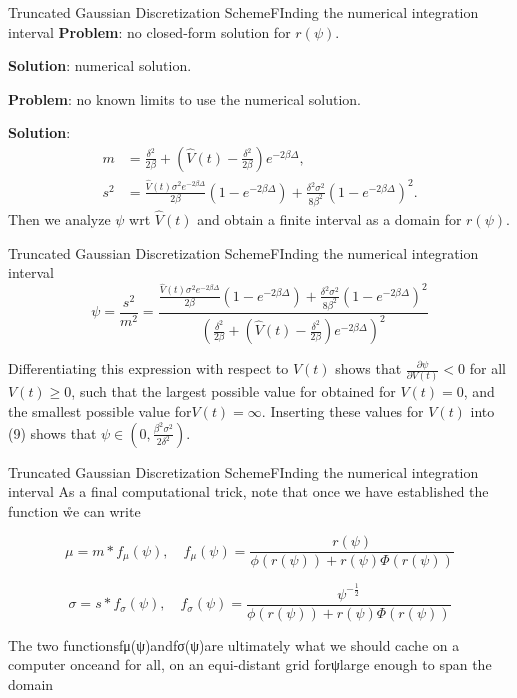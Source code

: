     \begin{frame}{Truncated Gaussian Discretization Scheme}{FInding the numerical integration interval}
        \textbf{Problem}: no closed-form solution for $r(\psi)$. 
        
        \textbf{Solution}: numerical solution.

        \textbf{Problem}: no known limits to use the numerical solution.

        \textbf{Solution}: 
        \begin{align}
            m   &= \frac{\delta^2}{2\beta} + \left(\hat{V}(t) - \frac{\delta^2}{2\beta}\right)e^{-2\beta \Delta},\\
            s^2 &= \frac{\hat{V}(t)\sigma^2e^{-2\beta \Delta}}{2\beta}\left(1 - e^{-2\beta \Delta}\right) + \frac{\delta^2\sigma^2}{8\beta^2}\left(1 - e^{-2\beta \Delta}\right)^2.
        \end{align}
        Then we analyze $\psi$ wrt $\hat{V}(t)$ and obtain a finite interval as a domain for $r(\psi)$.
    \end{frame}

    \begin{frame}{Truncated Gaussian Discretization Scheme}{FInding the numerical integration interval}
        \begin{equation}
            \psi = \frac{s^2}{m^2} = \frac{\frac{\hat{V}(t)\sigma^2e^{-2\beta \Delta}}{2\beta}\left(1 - e^{-2\beta \Delta}\right) + \frac{\delta^2\sigma^2}{8\beta^2}\left(1 - e^{-2\beta \Delta}\right)^2}{(\frac{\delta^2}{2\beta} + \left(\hat{V}(t) - \frac{\delta^2}{2\beta}\right)e^{-2\beta \Delta})^2}
        \end{equation}

        Differentiating this expression with respect to $V(t)$ shows that $\frac{\partial\psi}{\partial V(t)}<0$ for all $V(t)\geq0$, such that the largest possible value for \pisis obtained for $V(t)=0$, and the smallest possible value for$V(t)=\infty$. Inserting these values for $V(t)$ into (9) shows that $\psi \in (0, \frac{\beta^2\sigma^2}{2\delta^2})$.
    \end{frame}

    \begin{frame}{Truncated Gaussian Discretization Scheme}{FInding the numerical integration interval}
        As a final computational trick, note that once we have established the function \r we can write
        
        \begin{equation}
        \mu = m* f_\mu(\psi), \quad f_\mu(\psi)= \frac{r(\psi)}{\phi(r(\psi)) + r(\psi)\Phi(r(\psi))}
        \end{equation}

        \begin{equation}
        \sigma = s* f_\sigma(\psi), \quad f_\sigma(\psi)= \frac{\psi^{-\frac{1}{2}}}{\phi(r(\psi)) + r(\psi)\Phi(r(\psi))}
        \end{equation}

        The two functionsfμ(ψ)andfσ(ψ)are ultimately what we should cache on a computer onceand for all, on an equi-distant grid forψlarge enough to span the domain
    \end{frame}
